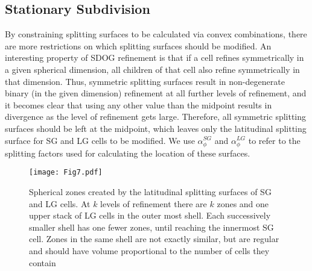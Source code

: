 \subsection{Stationary Subdivision} \label{sec:method-stationary}
By constraining splitting surfaces to be calculated via convex combinations, there are more restrictions on which splitting surfaces should be modified.
An interesting property of SDOG refinement is that if a cell refines symmetrically in a given spherical dimension, all children of that cell also refine symmetrically in that dimension.
Thus, symmetric splitting surfaces result in non-degenerate binary (in the given dimension) refinement at all further levels of refinement, and it becomes clear that using any other value than the midpoint results in divergence as the level of refinement gets large.
Therefore, all symmetric splitting surfaces should be left at the midpoint, which leaves only the latitudinal splitting surface for SG and LG cells to be modified.
We use $\alpha_{\phi}^{SG}$ and $\alpha_{\phi}^{LG}$ to refer to the splitting factors used for calculating the location of these surfaces.


\begin{figure}[tb]
	\texttt{[image: Fig7.pdf]}
	\caption[Title]{
		Spherical zones created by the latitudinal splitting surfaces of SG and LG cells.
		At $k$ levels of refinement there are $k$ zones and one upper stack of LG cells in the outer most shell.
		Each successively smaller shell has one fewer zones, until reaching the innermost SG cell.
		Zones in the same shell are not exactly similar, but are regular and should have volume proportional to the number of cells they contain
	}
	\label{fig:lat-splits}
\end{figure}


